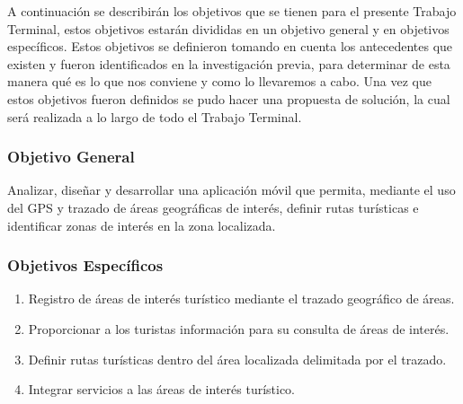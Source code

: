 \vspace*{7cm}
\rightline{{\Huge \textcolor{sectionColor}{Objetivos}}}
\vspace*{2cm}


A continuación se describirán los objetivos que se tienen para el presente Trabajo Terminal, estos objetivos estarán divididas en un objetivo general y en objetivos específicos. Estos objetivos se definieron tomando en cuenta los antecedentes que existen y fueron identificados en la investigación previa, para determinar de esta manera qué es lo que nos conviene y como lo llevaremos a cabo. Una vez que estos objetivos fueron definidos se pudo hacer una propuesta de solución, la cual será realizada a lo largo de todo el Trabajo Terminal.

\subsubsection{Objetivo General}

Analizar, diseñar y desarrollar una aplicación móvil que permita, mediante el uso del GPS y trazado de áreas geográficas de interés, definir rutas turísticas e identificar zonas de interés en la zona localizada. 

\subsubsection{Objetivos Específicos}

\begin{enumerate}
	\item Registro de áreas de interés turístico mediante el trazado geográfico de áreas.
	
	\item Proporcionar a los turistas información para su consulta de áreas de interés.
	
	\item Definir rutas turísticas dentro del área localizada delimitada por el trazado.
	
	\item Integrar servicios a las áreas de interés turístico.
\end{enumerate}

